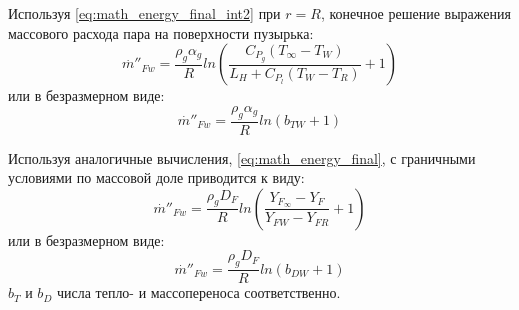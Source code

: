 Используя \cref{eq:math_energy_final_int2} при \(r=R\), конечное решение выражения массового расхода пара на поверхности пузырька:
\begin{equation}
{\stackrel{.}{m}}''_{Fw}= \frac{{\rho }_{g}{\alpha }_{g}}{R}ln\left(\frac{C_{{P}_{g}}\left(T_{\infty}-{T}_{W}\right)}{L_{H}+C_{{P}_{l}}\left(T_{W}-{T}_{R}\right)}+1\right) \end{equation}
или в безразмерном виде:
\begin{equation}
{\stackrel{.}{m}}''_{Fw}= \frac{{\rho }_{g}{\alpha }_{g}}{R}ln\left(b_{TW}+1\right)
\end{equation}

Используя аналогичные вычисления, \cref{eq:math_energy_final}, с граничными условиями по массовой доле
приводится к виду:
\begin{equation}
{\stackrel{.}{m}}''_{Fw}= \frac{{\rho }_{g}{D }_F}{R}ln\left(\frac{{Y}_{{F}_{\infty }}-{Y}_{F}}{{Y}_{FW}-{Y}_{FR}}+1\right) \end{equation}
или в безразмерном виде:
\begin{equation}
{\stackrel{.}{m}}''_{Fw}= \frac{{\rho }_{g}{D }_F}{R}ln\left(b_{DW}+1\right)
\end{equation}
\(b_{T}\) и \(b_{D}\) числа тепло- и массопереноса соответственно.

